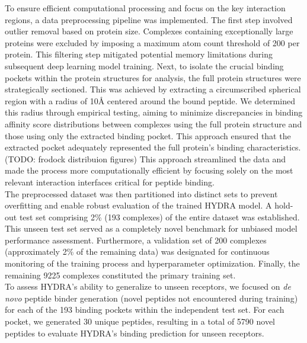 To ensure efficient computational processing and focus on the key interaction regions, a data preprocessing pipeline was implemented. The first step involved outlier removal based on protein size. Complexes containing exceptionally large proteins were excluded by imposing a maximum atom count threshold of 200 per protein. This filtering step mitigated potential memory limitations during subsequent deep learning model training. Next, to isolate the crucial binding pockets within the protein structures for analysis, the full protein structures were strategically sectioned. This was achieved by extracting a circumscribed spherical region with a radius of 10Å centered around the bound peptide. 
We determined this radius through empirical testing, aiming to minimize discrepancies in binding affinity score distributions between complexes using the full protein structure and those using only the extracted binding pocket. This approach ensured that the extracted pocket adequately represented the full protein's binding characteristics. (TODO: frodock distribuion figures)
This approach streamlined the data and made the process more computationally efficient by focusing solely on the most relevant interaction interfaces critical for peptide binding. \\

The preprocessed dataset was then partitioned into distinct sets to prevent overfitting and enable robust evaluation of the trained HYDRA model. A hold-out test set comprising 2\% (193 complexes) of the entire dataset was established. This unseen test set served as a completely novel benchmark for unbiased model performance assessment. Furthermore, a validation set of 200 complexes (approximately 2\% of the remaining data) was designated for continuous monitoring of the training process and hyperparameter optimization. Finally, the remaining 9225 complexes constituted the primary training set. \\

To assess HYDRA's ability to generalize to unseen receptors, we focused on \textit{de novo} peptide binder generation (novel peptides not encountered during training) for each of the 193 binding pockets within the independent test set. For each pocket, we generated 30 unique peptides, resulting in a total of 5790 novel peptides to evaluate HYDRA's binding prediction for unseen receptors.


